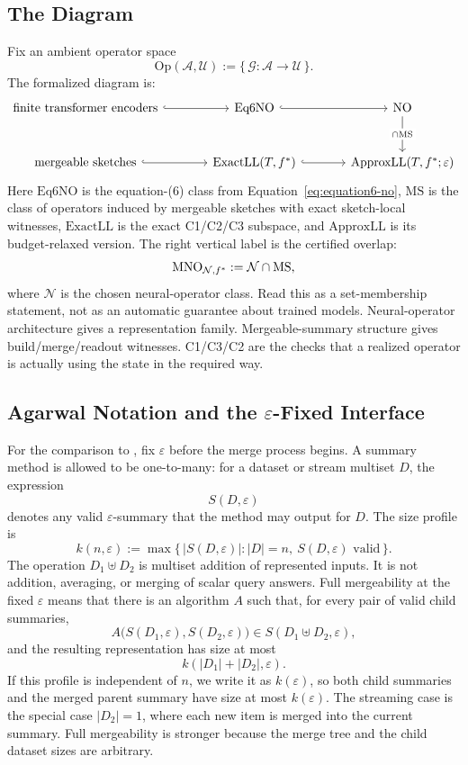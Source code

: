 \subsection{The Diagram}

Fix an ambient operator space
\[
\mathrm{Op}(\mathcal{A},\mathcal{U})
  := \{\,\mathcal{G}:\mathcal{A}\to\mathcal{U}\,\}.
\]
The formalized diagram is:
\[
\begin{tikzcd}[column sep=large,row sep=large]
\text{finite transformer encoders}
  \arrow[r, hook]
  & \mathrm{Eq6NO}
  \arrow[r, hook]
  & \mathrm{NO}
  \arrow[d, "\cap\mathrm{MS}" description] \\
\text{mergeable sketches}
  \arrow[r, hook]
  & \mathrm{ExactLL}(T,\fstar)
  \arrow[r, hook]
  & \mathrm{ApproxLL}(T,\fstar;\varepsilon)
\end{tikzcd}
\]
Here $\mathrm{Eq6NO}$ is the equation-(6) class from
Equation~\eqref{eq:equation6-no}, $\mathrm{MS}$ is the class of
operators induced by mergeable sketches with exact sketch-local
witnesses, $\mathrm{ExactLL}$ is the exact C1/C2/C3 subspace, and
$\mathrm{ApproxLL}$ is its budget-relaxed version. The right vertical
label is the certified overlap:
\[
\mathrm{MNO}_{\mathcal{N},f^\ast}
  :=
  \mathcal{N}\cap\mathrm{MS},
\]
where $\mathcal{N}$ is the chosen neural-operator class.
Read this as a set-membership statement, not as an automatic guarantee about
trained models. Neural-operator architecture gives a representation family.
Mergeable-summary structure gives build/merge/readout witnesses. C1/C3/C2
are the checks that a realized operator is actually using the state in the
required way.

\subsection{Agarwal Notation and the \texorpdfstring{$\varepsilon$}{epsilon}-Fixed Interface}

For the comparison to \citet{Agarwal2013MergeableTODS}, fix
$\varepsilon$ before the merge process begins. A summary method is allowed to
be one-to-many: for a dataset or stream multiset $D$, the expression
\[
S(D,\varepsilon)
\]
denotes any valid $\varepsilon$-summary that the method may output for $D$.
The size profile is
\[
k(n,\varepsilon)
  :=
  \max\{\, |S(D,\varepsilon)| : |D|=n,\ S(D,\varepsilon)\text{ valid}\,\}.
\]
The operation \(D_1\uplus D_2\) is multiset addition of represented inputs.
It is not addition, averaging, or merging of scalar query answers. Full
mergeability at the fixed $\varepsilon$ means that there is an algorithm $A$
such that, for every pair of valid child summaries,
\[
A\big(S(D_1,\varepsilon),S(D_2,\varepsilon)\big)
  \in S(D_1\uplus D_2,\varepsilon),
\]
and the resulting representation has size at most
\[
k(|D_1|+|D_2|,\varepsilon).
\]
If this profile is independent of $n$, we write it as $k(\varepsilon)$, so
both child summaries and the merged parent summary have size at most
$k(\varepsilon)$. The streaming case is the special case
\(|D_2|=1\), where each new item is merged into the current summary. Full
mergeability is stronger because the merge tree and the child dataset sizes are
arbitrary.

